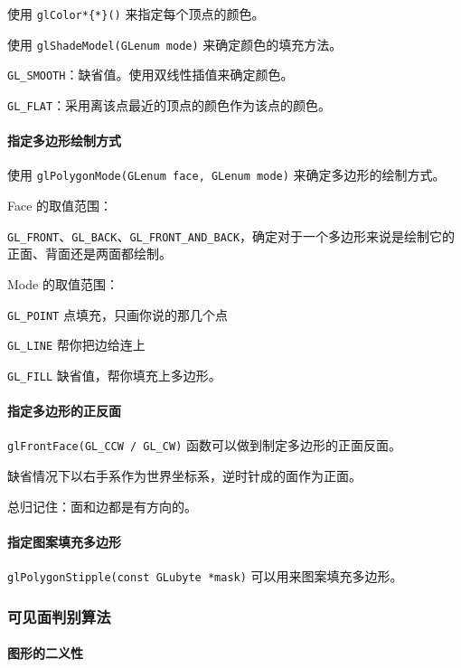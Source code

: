 \documentclass[
]{article}
\begin{document}
使用 \texttt{glColor*\{*\}()} 来指定每个顶点的颜色。

使用 \texttt{glShadeModel(GLenum\ mode)} 来确定颜色的填充方法。

\texttt{GL\_SMOOTH}：缺省值。使用双线性插值来确定颜色。

\texttt{GL\_FLAT}：采用离该点最近的顶点的颜色作为该点的颜色。

\hypertarget{header-n78}{%
\paragraph{指定多边形绘制方式}\label{header-n78}}

使用 \texttt{glPolygonMode(GLenum\ face,\ GLenum\ mode)}
来确定多边形的绘制方式。

Face 的取值范围：

\texttt{GL\_FRONT}、\texttt{GL\_BACK}、\texttt{GL\_FRONT\_AND\_BACK}，确定对于一个多边形来说是绘制它的正面、背面还是两面都绘制。

Mode 的取值范围：

\texttt{GL\_POINT} 点填充，只画你说的那几个点

\texttt{GL\_LINE} 帮你把边给连上

\texttt{GL\_FILL} 缺省值，帮你填充上多边形。

\hypertarget{header-n86}{%
\paragraph{指定多边形的正反面}\label{header-n86}}

\texttt{glFrontFace(GL\_CCW\ /\ GL\_CW)}
函数可以做到制定多边形的正面反面。

缺省情况下以右手系作为世界坐标系，逆时针成的面作为正面。

总归记住：面和边都是有方向的。

\hypertarget{header-n90}{%
\paragraph{指定图案填充多边形}\label{header-n90}}

\texttt{glPolygonStipple(const\ GLubyte\ *mask)}
可以用来图案填充多边形。

\hypertarget{header-n92}{%
\subsubsection{可见面判别算法}\label{header-n92}}

\hypertarget{header-n93}{%
\paragraph{图形的二义性}\label{header-n93}}
\end{document}

